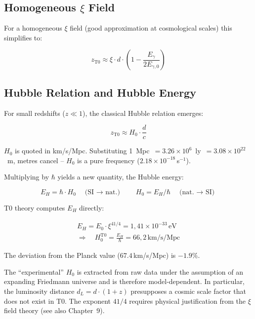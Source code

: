 \subsection{Homogeneous $\xi$ Field}

For a homogeneous $\xi$ field (good approximation at cosmological scales) 
this simplifies to:

\begin{equation}
z_{\text{T0}} \approx \xi \cdot d \cdot \left(1 - \frac{E_\gamma}{2E_{\gamma,0}}\right)
\label{eq:redshift_t0_homogeneous}
\end{equation}

\subsection{Hubble Relation and Hubble Energy}

For small redshifts ($z \ll 1$), the classical Hubble relation emerges:

\begin{equation}
z_{\text{T0}} \approx H_0 \cdot \frac{d}{c}
\label{eq:hubble_t0}
\end{equation}

$H_0$ is quoted in km/s/Mpc. Substituting 
1~Mpc~$= 3.26 \times 10^6$~ly~$= 3.08 \times 10^{22}$~m, 
metres cancel -- $H_0$ is a pure frequency 
($2.18 \times 10^{-18}\,$s$^{-1}$).

Multiplying by $\hbar$ yields a new quantity, the 
Hubble energy:

\begin{equation}
E_H = \hbar \cdot H_0 \quad\text{(SI $\to$ nat.)}
\qquad
H_0 = E_H / \hbar \quad\text{(nat. $\to$ SI)}
\label{eq:hubble_constant_t0}
\end{equation}

T0 theory computes $E_H$ directly:

\begin{align}
	\boxed{E_H = E_0 \cdot \xi^{41/4} = 1{,}41 \times 10^{-33}\,\text{eV}} \label{eq:hubble_energy} \\
	\Longrightarrow\quad H_0^{\text{T0}} = \frac{E_H}{\hbar} = 66{,}2\,\text{km/s/Mpc} \label{eq:hubble_constant}
\end{align}

The deviation from the Planck value ($67.4\,$km/s/Mpc) is $-1.9\%$.

\begin{remark}
	The ``experimental'' $H_0$ is extracted from raw data under the 
	assumption of an expanding Friedmann universe and is therefore 
	model-dependent. In particular, the luminosity 
	distance $d_L = d \cdot (1+z)$ presupposes a cosmic scale factor that 
	does not exist in T0. The exponent $41/4$ requires physical justification 
	from the $\xi$ field theory (see also Chapter~9).
\end{remark}

